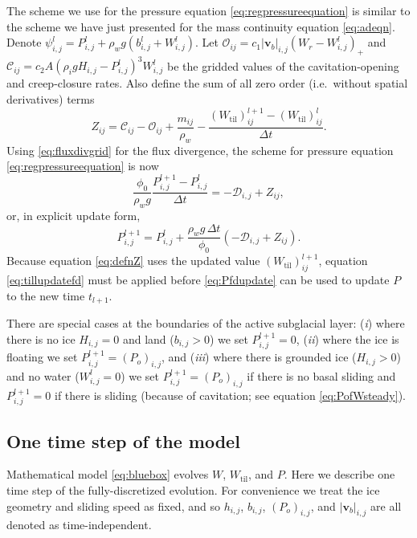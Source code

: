 \documentclass[gmd]{copernicus}   %
\newcommand{\text}{\textrm}
\newcommand\bv{\mathbf{v}}
\newcommand{\Wtil}{W_{\text{til}}}
\newcommand{\Wlij}{W^l_{i,j}}
\newcommand{\Plij}{P^l_{i,j}}
\begin{document}
The scheme we use for the pressure equation \eqref{eq:regpressureequation} is similar to the scheme we have just presented for the mass continuity equation \eqref{eq:adeqn}.  Denote $\psi_{i,j}^l = P_{i,j}^l + \rho_w g (b_{i,j}^l + W_{i,j}^l)$.  Let $\mathcal{O}_{ij} = c_1 |\bv_b|_{i,j} \left(W_r - \Wlij\right)_+$ and $\mathcal{C}_{ij} = c_2 A \left(\rho_i g H_{i,j} - \Plij\right)^3 \Wlij$ be the gridded values of the cavitation-opening and creep-closure rates.  Also define the sum of all zero order (i.e.~without spatial derivatives) terms
\begin{equation}
Z_{ij} = \mathcal{C}_{ij} - \mathcal{O}_{ij} + \frac{m_{ij}}{\rho_w} - \frac{(\Wtil)_{ij}^{l+1} - (\Wtil)_{ij}^l}{\Delta t}.  \label{eq:defnZ}
\end{equation}
Using \eqref{eq:fluxdivgrid} for the flux divergence, the scheme for pressure equation \eqref{eq:regpressureequation} is now
\begin{equation}
\frac{\phi_0}{\rho_w g} \frac{P_{i,j}^{l+1} - \Plij}{\Delta t} = - \mathcal{D}_{i,j} + Z_{ij},  \label{eq:Pfd}
\end{equation}
or, in explicit update form,
\begin{equation}
P_{i,j}^{l+1} = \Plij + \frac{\rho_w g\,\Delta t}{\phi_0} \left(- \mathcal{D}_{i,j} + Z_{ij}\right). \label{eq:Pfdupdate}
\end{equation}
Because equation \eqref{eq:defnZ} uses the updated value $(\Wtil)_{ij}^{l+1}$, equation \eqref{eq:tillupdatefd} must be applied before \eqref{eq:Pfdupdate} can be used to update $P$ to the new time $t_{l+1}$.

There are special cases at the boundaries of the active subglacial layer: (\emph{i}) where there is no ice $H_{i,j}=0$ and land ($b_{i,j}>0$) we set $P_{i,j}^{l+1}=0$, (\emph{ii}) where the ice is floating we set $P_{i,j}^{l+1}=(P_o)_{i,j}$, and (\emph{iii}) where there is grounded ice ($H_{i,j}>0$) and no water ($W_{i,j}^l=0$) we set $P_{i,j}^{l+1}=(P_o)_{i,j}$ if there is no basal sliding and $P_{i,j}^{l+1}=0$ if there is sliding (because of cavitation; see equation \eqref{eq:PofWsteady}).

\subsection{One time step of the model}  Mathematical model \eqref{eq:bluebox} evolves $W$, $\Wtil$, and $P$.  Here we describe one time step of the fully-discretized evolution.  For convenience we treat the ice geometry and sliding speed as fixed, and so $h_{i,j}$, $b_{i,j}$, $(P_o)_{i,j}$, and $|\bv_b|_{i,j}$ are all denoted as time-independent.
\end{document}
